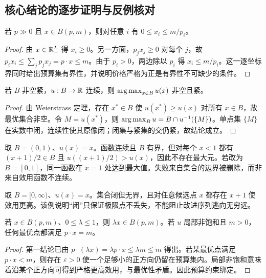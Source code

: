 \subsection{核心结论的逐步证明与反例核对}

\begin{proposition}[预算集的逐坐标界]
若 $p\gg0$ 且 $x\in B(p,m)$，则对任意 $i$ 有 $0\le x_i\le m/p_i$。
\end{proposition}
\begin{proof}
由 $x\in\mathbb{R}_+^L$ 得 $x_i\ge0$。另一方面，$p_jx_j\ge0$ 对每个 $j$，故
$p_ix_i\le\sum_jp_jx_j=p\cdot x\le m$。由于 $p_i>0$，两边除以 $p_i$ 得 $x_i\le m/p_i$。这一逐坐标界同时给出预算集有界性，并说明价格严格为正是有界性不可缺少的条件。
\end{proof}

\begin{proposition}[最大值定理的应用]
若 $B$ 非空紧，$u:B\to\mathbb{R}$ 连续，则 $\operatorname*{arg\,max}_{x\in B}u(x)$ 非空且紧。
\end{proposition}
\begin{proof}
由 Weierstrass 定理，存在 $x^*\in B$ 使 $u(x^*)\ge u(x)$ 对所有 $x\in B$，故最优集合非空。令 $M=u(x^*)$，则
$\operatorname*{arg\,max}_Bu=B\cap u^{-1}(\{M\})$。单点集 $\{M\}$ 在实数中闭，连续性使其原像闭；闭集与紧集的交仍紧，故结论成立。
\end{proof}

\begin{example}[去掉闭性后的失败]
取 $B=(0,1)$、$u(x)=x$。函数连续且 $B$ 有界，但对每个 $x<1$ 都有 $(x+1)/2\in B$ 且 $u((x+1)/2)>u(x)$，因此不存在最大元。若改为 $B=[0,1]$，同一函数在 $x=1$ 处达到最大值。失败来自集合的边界被删除，而非来自效用函数不连续。
\end{example}

\begin{example}[去掉有界性后的失败]
取 $B=[0,\infty)$、$u(x)=x$。集合闭但无界，且对任意候选点 $x$ 都存在 $x+1$ 使效用更高。该例说明“闭”只保证极限点不丢失，不能阻止改进序列逃向无穷远。
\end{example}

\begin{proposition}[向下闭合与财富耗尽]
若 $x\in B(p,m)$、$0\le\lambda\le1$，则 $\lambda x\in B(p,m)$。若 $u$ 局部非饱和且 $m>0$，任何最优点都满足 $p\cdot x=m$。
\end{proposition}
\begin{proof}
第一结论已由 $p\cdot(\lambda x)=\lambda p\cdot x\le\lambda m\le m$ 得出。若某最优点满足 $p\cdot x<m$，则存在 $\varepsilon>0$ 使一个足够小的正方向仍留在预算集内。局部非饱和意味着沿某个正方向可得到严格更高效用，与最优性矛盾。因此预算约束绑定。
\end{proof}

